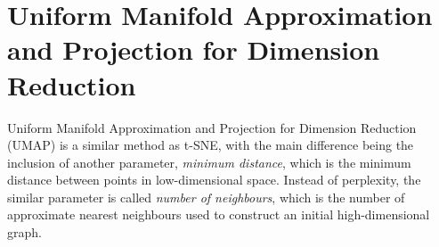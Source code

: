 \section{Uniform Manifold Approximation and Projection for Dimension Reduction}
Uniform Manifold Approximation and Projection for Dimension Reduction (UMAP) is a similar method as t-SNE, with the main difference being the inclusion of another parameter, \emph{minimum distance}, which is the minimum distance between points in low-dimensional space.
Instead of perplexity, the similar parameter is called \emph{number of neighbours}, which is the number of approximate nearest neighbours used to construct an initial high-dimensional graph.
